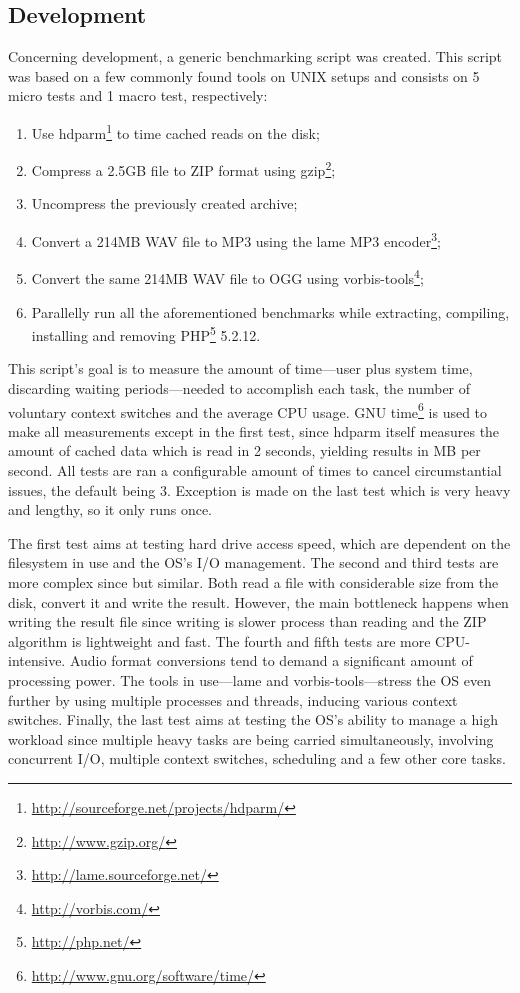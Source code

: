 \subsection{Development}
Concerning development, a generic benchmarking script was created. This script was based on a few commonly found tools on UNIX setups and consists on 5 micro tests and 1 macro test, respectively:
\begin{enumerate}
  \item Use hdparm\footnote{\url{http://sourceforge.net/projects/hdparm/}} to time cached reads on the disk;
  \item Compress a 2.5GB file to ZIP format using gzip\footnote{\url{http://www.gzip.org/}};
  \item Uncompress the previously created archive;
  \item Convert a 214MB WAV file to MP3 using the lame MP3 encoder\footnote{\url{http://lame.sourceforge.net/}};
  \item Convert the same 214MB WAV file to OGG using vorbis-tools\footnote{\url{http://vorbis.com/}};
  \item Parallelly run all the aforementioned benchmarks while extracting, compiling, installing and removing PHP\footnote{\url{http://php.net/}} 5.2.12.
\end{enumerate}
This script's goal is to measure the amount of time---user plus system time, discarding waiting periods---needed to accomplish each task, the number of voluntary context switches and the average CPU usage. GNU time\footnote{\url{http://www.gnu.org/software/time/}} is used to make all measurements except in the first test, since hdparm itself measures the amount of cached data which is read in 2 seconds, yielding results in MB per second. All tests are ran a configurable amount of times to cancel circumstantial issues, the default being 3. Exception is made on the last test which is very heavy and lengthy, so it only runs once.

The first test aims at testing hard drive access speed, which are dependent on the filesystem in use and the OS's I/O management. The second and third tests are more complex since but similar. Both read a file with considerable size from the disk, convert it and write the result. However, the main bottleneck happens when writing the result file since writing is slower process than reading and the ZIP algorithm is lightweight and fast. The fourth and fifth tests are more CPU-intensive. Audio format conversions tend to demand a significant amount of processing power. The tools in use---lame and vorbis-tools---stress the OS even further by using multiple processes and threads, inducing various context switches. Finally, the last test aims at testing the OS's ability to manage a high workload since multiple heavy tasks are being carried simultaneously, involving concurrent I/O, multiple context switches, scheduling and a few other core tasks.

